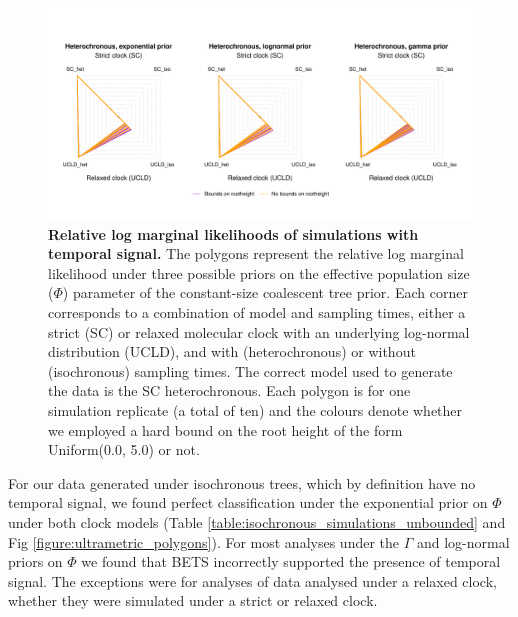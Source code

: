 \documentclass[10pt,letterpaper]{article}
\begin{document}
\begin{figure}[!h]
	\begin{center}
		\includegraphics[width=14cm]{sandbox_figures/het_sims.pdf}\newline
		\vspace{-0.5cm}
		\caption{\textbf{Relative log marginal likelihoods of simulations with temporal signal.} The polygons represent the relative log marginal likelihood under three possible priors on the effective population size ($\Phi$) parameter of the constant-size coalescent tree prior. Each corner corresponds to a combination of model and sampling times, either a strict (SC) or relaxed molecular clock with an underlying log-normal distribution (UCLD), and with (heterochronous) or without (isochronous) sampling times. The correct model used to generate the data is the SC heterochronous. Each polygon is for one simulation replicate (a total of ten) and the colours denote whether we employed a hard bound on the root height of the form Uniform(0.0, 5.0) or not.} 
		\label{figure:heterochronous_polygons}
	\end{center}
\end{figure}

For our data generated under isochronous trees, which by definition have no temporal signal, we found perfect classification under the exponential prior on $\Phi$ under both clock models (Table \ref{table:isochronous_simulations_unbounded} and Fig \ref{figure:ultrametric_polygons}). For most analyses under the $\Gamma$ and log-normal priors on $\Phi$ we found that BETS incorrectly supported the presence of temporal signal. The exceptions were for analyses of data analysed under a relaxed clock, whether they were simulated under a strict or relaxed clock. 
\end{document}
